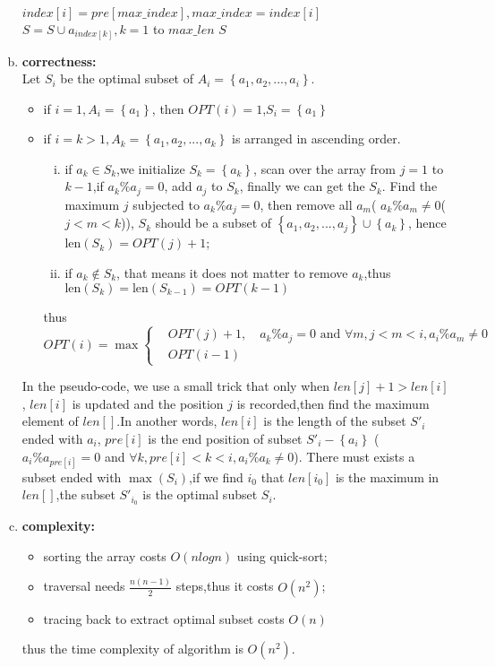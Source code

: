 \begin{enumerate}[a).]
\begin{algorithm}[H]
\begin{algorithmic}[1]
			\State $index[i] = pre[max\_index], max\_index = index[i]$
		\EndFor 
		\State $S = S\cup a_{index[k]}, k = 1$ to $max\_len$
		\State \Return $S$
		\EndFunction 
	\end{algorithmic}	
\end{algorithm} 
\item \textbf{correctness:} \\
Let $S_i$ be the optimal subset of $A_i = \left\lbrace a_1,a_2,...,a_i\right\rbrace $.
	\begin{itemize}
		\item if $i=1,A_i=\left\lbrace a_1\right\rbrace $, then $OPT(i) = 1$,$S_i=\left\lbrace a_1\right\rbrace $	
		\item if $i=k > 1,A_k=\left\lbrace a_1,a_2,...,a_k\right\rbrace $ is arranged in ascending order.
		 \begin{enumerate}[i.]
		 	\item if $a_k \in S_k$,we initialize $S_k=\left\lbrace a_k \right\rbrace$,
		 	scan over the array from $j=1$ to 
		 	$k-1$,if $a_k\%a_j =0$, add $a_j$ to $S_k$, finally we can get the $S_k$.
		 	Find the maximum $j$ subjected to $a_k\%a_j=0$, then
		 	remove all $a_m$( $a_k\%a_m \neq 0$($ j < m < k$)),
		 	$S_k$ should be a subset of $\left\lbrace a_1,a_2,...,a_j \right\rbrace\cup 
		 	\left\lbrace a_k\right\rbrace $,
		 	 hence $\text{len}(S_k)
		 	= OPT(j) + 1$;
		 	\item if $a_k \notin S_k$,
		 	that means it does not matter to remove $a_k$,thus $\text{len}(S_k) = \text{len}(S_{k-1})=OPT(k-1)$	
		 \end{enumerate}
	   thus 
	   \[
		   OPT(i) = \max\left\lbrace \begin{split}
		   &OPT(j) + 1,\quad a_k\%a_{j} = 0 \text{ and }\forall m, j<m<i, a_i\%a_{m} \neq 0 \\  
		   &OPT(i-1) 
		   \end{split}\right. 
	   \]	
	\end{itemize} 
	\quad In the pseudo-code, we use a small trick that only when $len[j]+1 > len[i]$ ,
	$len[i]$ is updated and the position $j$ is recorded,then find the maximum
	element of $len[]$.In another words,
	$len[i]$ is the length of the subset $S'_i$ ended with $a_i$,
	 $pre[i]$ is the end position of  subset $S'_i-\left\lbrace{a_i} \right\rbrace$ ($ a_i\%a_{pre[i]}=0$ and
	 $\forall k,pre[i]<k<i, a_i\%a_k \neq 0$).
	There must exists a subset ended with $\max(S_i)$,if we find
	$i_0$ that $len[i_0]$ is the maximum in $len[]$,the subset $S'_{i_0}$ is the
	optimal subset $S_i$.
	
\item \textbf{complexity:}
\begin{itemize}
	\item sorting the array costs  $O(nlogn)$ using quick-sort;
	\item traversal needs $\frac{n(n-1)}{2}$ steps,thus it costs $O(n^2)$;
	\item tracing back to extract optimal subset costs $O(n)$
\end{itemize}
thus the time complexity of algorithm is $O(n^2)$.

\end{enumerate} 